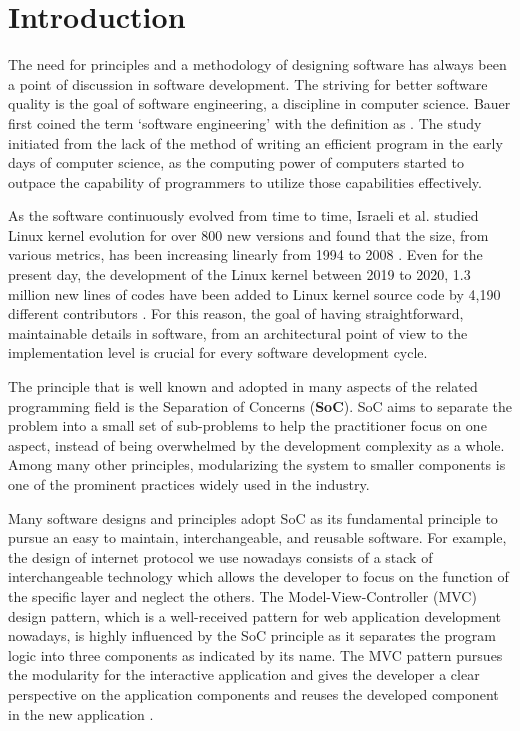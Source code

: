 \chapter*{Introduction}
The need for principles and a methodology of designing software has always been a point of discussion in software development. The striving for better software quality is the goal of software engineering, a discipline in computer science. Bauer \cite{DBLP:conf/ifip/Bauer71} first coined the term ‘software engineering’ with the definition as . The study initiated from the lack of the method of writing an efficient program in the early days of computer science, as the computing power of computers started to outpace the capability of programmers to utilize those capabilities effectively.

As the software continuously evolved from time to time, Israeli et al. studied Linux kernel evolution for over 800 new versions and found that the size, from various metrics, has been increasing linearly from 1994 to 2008 \cite{10.1016/j.jss.2009.09.042}. Even for the present day, the development of the Linux kernel between 2019 to 2020, 1.3 million new lines of codes have been added to Linux kernel source code by 4,190 different contributors \cite{anderson2020}. For this reason, the goal of having straightforward, maintainable details in software, from an architectural point of view to the implementation level is crucial for every software development cycle.

The principle that is well known and adopted in many aspects of the related programming field is the Separation of Concerns (\textbf{SoC}). SoC aims to separate the problem into a small set of sub-problems to help the practitioner focus on one aspect, instead of being overwhelmed by the development complexity as a whole. Among many other principles, modularizing the system to smaller components is one of the prominent practices widely used in the industry.

Many software designs and principles adopt SoC as its fundamental principle to pursue an easy to maintain, interchangeable, and reusable software. For example, the design of internet protocol we use nowadays consists of a stack of interchangeable technology which allows the developer to focus on the function of the specific layer and neglect the others\cite{stack-1994}. The Model-View-Controller (MVC) design pattern, which is a well-received pattern for web application development nowadays, is highly influenced by the SoC principle as it separates the program logic into three components as indicated by its name. The MVC pattern pursues the modularity for the interactive application and gives the developer a clear perspective on the application components and reuses the developed component in the new application \cite{krasner88joop}.

